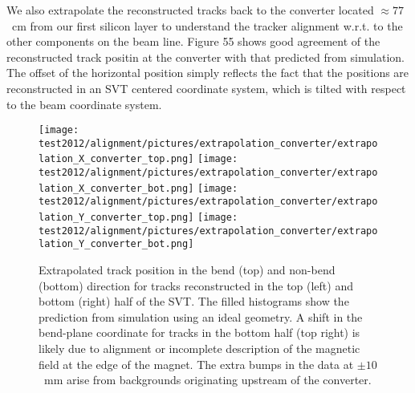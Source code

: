 We also extrapolate the reconstructed tracks back to the converter located $\approx 77$~cm 
from our first silicon layer to understand the tracker alignment w.r.t. to the other components on the 
beam line. Figure 55 shows good agreement of the reconstructed track positin at the converter with that predicted from simulation. The offset of the horizontal position simply reflects the fact that the positions are reconstructed in an SVT centered coordinate system, which is tilted with respect to the beam coordinate system.
\begin{figure*}[t]
\texttt{[image: test2012/alignment/pictures/extrapolation\_converter/extrapolation\_X\_converter\_top.png]}
\texttt{[image: test2012/alignment/pictures/extrapolation\_converter/extrapolation\_X\_converter\_bot.png]}
\texttt{[image: test2012/alignment/pictures/extrapolation\_converter/extrapolation\_Y\_converter\_top.png]}
\texttt{[image: test2012/alignment/pictures/extrapolation\_converter/extrapolation\_Y\_converter\_bot.png]}
\caption{\small{Extrapolated track position in the bend (top) and non-bend (bottom) 
direction for tracks reconstructed in the top (left) and bottom (right) half of the SVT. 
The filled histograms show the prediction from simulation using an ideal geometry. 
A shift in the bend-plane coordinate for tracks in the bottom half (top right) is likely due to alignment or incomplete description of the
magnetic field at the edge of the magnet.
The extra bumps in the data at $\pm10$~mm arise from backgrounds originating upstream of the 
converter.}}
\label{fig:extrapol_converter}
\end{figure*}

